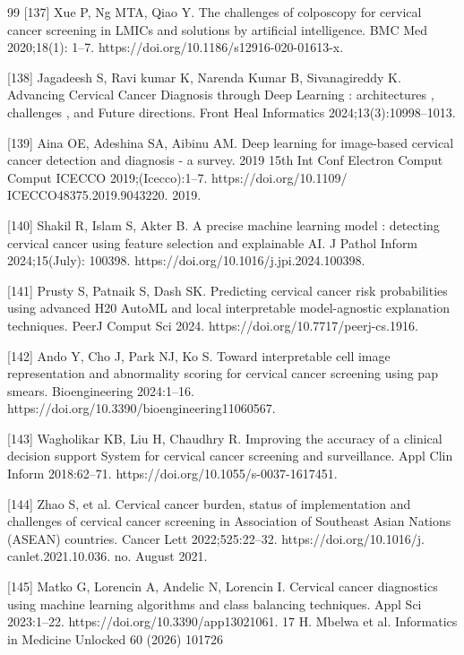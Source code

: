 \documentclass[final,5p,times,twocolumn,authoryear]{elsarticle}
\begin{document}
\begin{thebibliography}{99}
 [137] Xue P, Ng MTA, Qiao Y. The challenges of colposcopy for cervical cancer screening in LMICs and solutions by artificial intelligence. BMC Med 2020;18(1): 1–7. https://doi.org/10.1186/s12916-020-01613-x.

 [138] Jagadeesh S, Ravi kumar K, Narenda Kumar B, Sivanagireddy K. Advancing Cervical Cancer Diagnosis through Deep Learning : architectures , challenges , and Future directions. Front Heal Informatics 2024;13(3):10998–1013.

 [139] Aina OE, Adeshina SA, Aibinu AM. Deep learning for image-based cervical cancer detection and diagnosis - a survey. 2019 15th Int Conf Electron Comput Comput ICECCO 2019;(Icecco):1–7. https://doi.org/10.1109/ ICECCO48375.2019.9043220. 2019.

 [140] Shakil R, Islam S, Akter B. A precise machine learning model : detecting cervical cancer using feature selection and explainable AI. J Pathol Inform 2024;15(July): 100398. https://doi.org/10.1016/j.jpi.2024.100398.

 [141] Prusty S, Patnaik S, Dash SK. Predicting cervical cancer risk probabilities using advanced H20 AutoML and local interpretable model-agnostic explanation techniques. PeerJ Comput Sci 2024. https://doi.org/10.7717/peerj-cs.1916.

 [142] Ando Y, Cho J, Park NJ, Ko S. Toward interpretable cell image representation and abnormality scoring for cervical cancer screening using pap smears. Bioengineering 2024:1–16. https://doi.org/10.3390/bioengineering11060567.

 [143] Wagholikar KB, Liu H, Chaudhry R. Improving the accuracy of a clinical decision support System for cervical cancer screening and surveillance. Appl Clin Inform 2018:62–71. https://doi.org/10.1055/s-0037-1617451.

 [144] Zhao S, et al. Cervical cancer burden, status of implementation and challenges of cervical cancer screening in Association of Southeast Asian Nations (ASEAN) countries. Cancer Lett 2022;525:22–32. https://doi.org/10.1016/j. canlet.2021.10.036. no. August 2021.

 [145] Matko G, Lorencin A, Andelic N, Lorencin I. Cervical cancer diagnostics using machine learning algorithms and class balancing techniques. Appl Sci 2023:1–22. https://doi.org/10.3390/app13021061. 17
H. Mbelwa et al. Informatics in Medicine Unlocked 60 (2026) 101726


\end{thebibliography}
\end{document}
